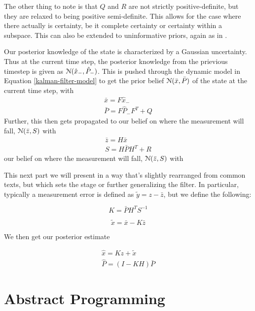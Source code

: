 The other thing to note is that $Q$ and $R$ are not strictly positive-definite, but they are relaxed to being positive semi-definite. This allows for the case where there actually is certainty, be it complete certainty or certainty within a subspace. This can also be extended to uninformative priors, again as in \cite{extended-gaussian}.

Our posterior knowledge of the state is characterized by a Gaussian uncertainty.
Thus at the current time step, the posterior knowledge from the prievious timestep is given as $\mathcal{N}(\hat{x}_-, \hat{P}_-)$.
This is pushed through the dynamic model in Equation \ref{kalman-filter-model} to get the prior belief $\mathcal{N}(\bar{x}, \bar{P})$ of the state at the current time step, with
\begin{align}
	\bar{x} = F\hat{x}_-\\
	\bar{P} = F\hat{P}_- F^T + Q
\end{align}
Further, this then gets propagated to our belief on where the measurement will fall, $\mathcal{N}(\bar{z}, S)$ with
\begin{align}
	\bar{z} = H\bar{x}\\
	S = H\bar{P} H^T + R
\end{align}
our belief on where the measurement will fall, $\mathcal{N}(\bar{z}, S)$ with

This next part we will present in a way that's slightly rearranged from common texts, but which sets the stage or further generalizing the filter.
In particular, typically a measurement error is defined as $\tilde{y} = z - \bar{z}$, but we define the following:

\begin{equation}
	K = \bar{P}H^T S^{-1}
\end{equation}

\begin{equation}
	\tilde{x} = \bar{x} - K\bar{z}
\end{equation}

We then get our posterior estimate

\begin{align}
	\hat{x} = Kz + \tilde{x} \\
	\hat{P} = (I-KH)\bar{P}
\end{align}

\section{Abstract Programming}

